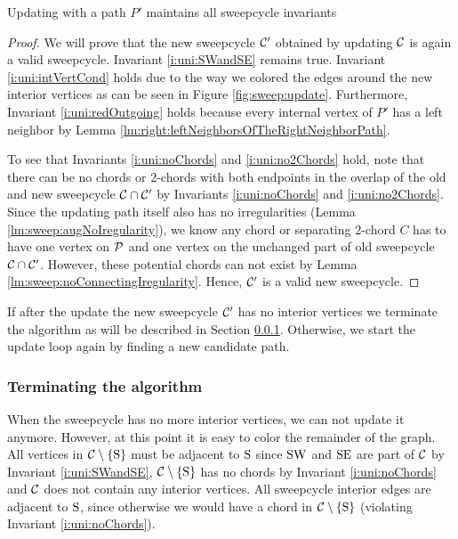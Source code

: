   \begin{lemma}
    \label{lm:sweep:updateMaintainsInvariants}
    Updating with a path $P'$ maintains all sweepcycle invariants
  \end{lemma}
  \begin{proof}
    We will prove that the new sweepcycle $\C'$ obtained by updating $\C$ is again a valid sweepcycle. Invariant \ref{i:uni:SWandSE} remains true. Invariant \ref{i:uni:intVertCond} holds due to the way we colored the edges around the new interior vertices as can be seen in Figure \ref{fig:sweep:update}.
    Furthermore, Invariant \ref{i:uni:redOutgoing} holds because every internal vertex of $P'$ has a left neighbor by Lemma \ref{lm:right:leftNeighborsOfTheRightNeighborPath}.

    To see that Invariants \ref{i:uni:noChords} and \ref{i:uni:no2Chords} hold, note that there can be no chords or $2$-chords with both endpoints in the overlap of the old and new sweepcycle $\C \cap \C'$ by Invariants \ref{i:uni:noChords} and \ref{i:uni:no2Chords}.
     Since the updating path itself also has no irregularities (Lemma \ref{lm:sweep:augNoIregularity}),
    we know any chord or separating $2$-chord $C$ has to have one vertex on $\P$ and one vertex on the unchanged part of old sweepcycle $\C \cap \C'$.
    However, these potential chords can not exist by Lemma \ref{lm:sweep:noConnectingIregularity}.
    Hence, $\C'$ is a valid new sweepcycle.
  \end{proof}

  If after the update the new sweepcycle $\C'$ has no interior vertices we terminate the algorithm as will be described in Section \ref{sss:terminating}.
  Otherwise, we start the update loop again by finding a new candidate path.

\subsubsection{Terminating the algorithm}
  \label{sss:terminating}
  When the sweepcycle has no more interior vertices, we can not update it anymore.
  However, at this point it is easy to color the remainder of the graph.
  All vertices in $\cpath$ must be adjacent to $\pS$ since $\pS \pW$ and $\pS \pE$ are part of $\C$ by Invariant \ref{i:uni:SWandSE}, $\cpath$ has no chords by Invariant \ref{i:uni:noChords} and $\C$ does not contain any interior vertices.
  All sweepcycle interior edges are adjacent to $\pS$, since otherwise we would have a chord in $\cpath$ (violating Invariant \ref{i:uni:noChords}).


